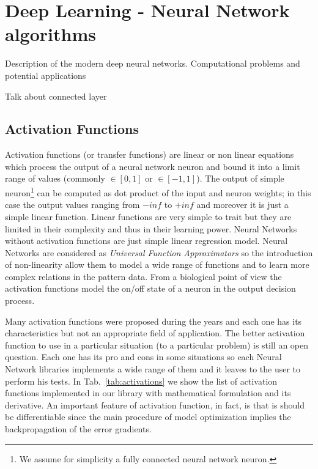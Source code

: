 \documentclass{standalone}
\begin{document}
\chapter[Deep Learning]{Deep Learning - Neural Network algorithms}\label{neural}

Description of the modern deep neural networks.
Computational problems and potential applications

Talk about connected layer


\section[Activation functions]{Activation Functions}\label{activation}

Activation functions (or transfer functions) are linear or non linear equations which process the output of a neural network neuron and bound it into a limit range of values (commonly $\in[0, 1]$ or $\in[-1, 1]$).
The output of simple neuron\footnote{
  We assume for simplicity a fully connected neural network neuron.
} can be computed as dot product of the input and neuron weights; in this case the output values ranging from $-inf$ to $+inf$ and moreover it is just a simple linear function.
Linear functions are very simple to trait but they are limited in their complexity and thus in their learning power.
Neural Networks without activation functions are just simple linear regression model.
Neural Networks are considered as \emph{Universal Function Approximators} so the introduction of non-linearity allow them to model a wide range of functions and to learn more complex relations in the pattern data.
From a biological point of view the activation functions model the on/off state of a neuron in the output decision process.

Many activation functions were proposed during the years and each one has its characteristics but not an appropriate field of application.
The better activation function to use in a particular situation (to a particular problem) is still an open question.
Each one has its pro and cons in some situations so each Neural Network libraries implements a wide range of them and it leaves to the user to perform his tests.
In Tab.~\ref{tab:activations} we show the list of activation functions implemented in our library with mathematical formulation and its derivative.
An important feature of activation function, in fact, is that is should be differentiable since the main procedure of model optimization implies the backpropagation of the error gradients.
\end{document}
